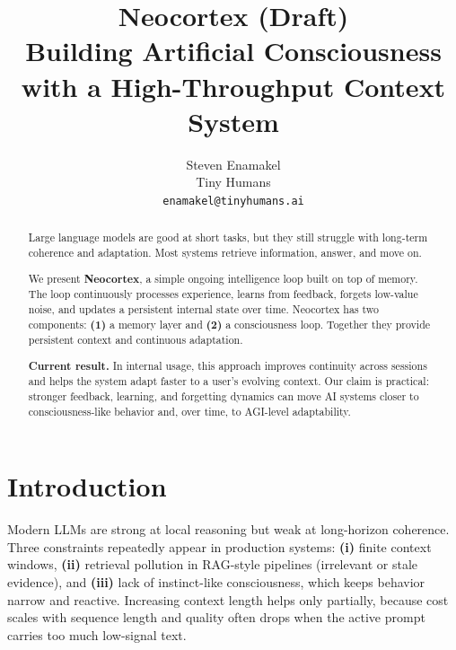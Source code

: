 \documentclass{article}
\title{Neocortex (Draft)\\\large Building Artificial Consciousness with a High-Throughput Context System}
\author{
 Steven Enamakel \\
  Tiny Humans \\
  \texttt{enamakel@tinyhumans.ai} \\
}
\begin{document}
\maketitle
\begin{abstract}
\vspace{-0.2em}
{\small
\begin{minipage}{\linewidth}
\setlength{\parskip}{0.35em}
\noindent
Large language models are good at short tasks, but they still struggle with
long-term coherence and adaptation. Most systems retrieve information, answer,
and move on.

\smallskip\noindent
We present \textbf{Neocortex}, a simple ongoing intelligence loop built on top
of memory. The loop continuously processes experience, learns from feedback,
forgets low-value noise, and updates a persistent internal state over time.
\smallskip\noindent
Neocortex has two components: \textbf{(1)} a memory layer and
\textbf{(2)} a consciousness loop. Together they provide persistent context
and continuous adaptation.

\smallskip\noindent
\textbf{Current result.} In internal usage, this approach improves continuity
across sessions and helps the system adapt faster to a user's evolving context.
Our claim is practical: stronger feedback, learning, and forgetting dynamics
can move AI systems closer to consciousness-like behavior and, over time, to
AGI-level adaptability.
\end{minipage}
}

\end{abstract}


\section{Introduction}

Modern LLMs are strong at local reasoning but weak at long-horizon
coherence. Three constraints repeatedly appear in production systems:
\textbf{(i)} finite context windows, \textbf{(ii)} retrieval pollution in
RAG-style pipelines (irrelevant or stale evidence), and
\textbf{(iii)} lack of instinct-like consciousness, which keeps behavior
narrow and reactive. Increasing context length helps only partially, because
cost scales with sequence length and quality often drops when the active prompt
carries too much low-signal text.
\end{document}
